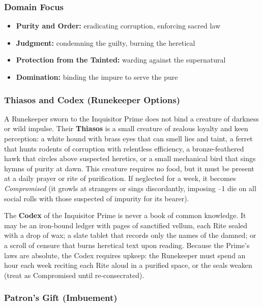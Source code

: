 \subsubsection*{Domain Focus}
\begin{itemize}
  \item \textbf{Purity and Order:} eradicating corruption, enforcing sacred law
  \item \textbf{Judgment:} condemning the guilty, burning the heretical
  \item \textbf{Protection from the Tainted:} warding against the supernatural
  \item \textbf{Domination:} binding the impure to serve the pure
\end{itemize}

\subsubsection*{Thiasos and Codex (Runekeeper Options)}

A Runekeeper sworn to the Inquisitor Prime does not bind a creature of darkness or wild impulse. Their \textbf{Thiasos} is a small creature of zealous loyalty and keen perception: a white hound with brass eyes that can smell lies and taint, a ferret that hunts rodents of corruption with relentless efficiency, a bronze-feathered hawk that circles above suspected heretics, or a small mechanical bird that sings hymns of purity at dawn. This creature requires no food, but it must be present at a daily prayer or rite of purification. If neglected for a week, it becomes \textit{Compromised} (it growls at strangers or sings discordantly, imposing --1 die on all social rolls with those suspected of impurity for its bearer).

The \textbf{Codex} of the Inquisitor Prime is never a book of common knowledge. It may be an iron-bound ledger with pages of sanctified vellum, each Rite sealed with a drop of wax; a slate tablet that records only the names of the damned; or a scroll of censure that burns heretical text upon reading. Because the Prime's laws are absolute, the Codex requires upkeep: the Runekeeper must spend an hour each week reciting each Rite aloud in a purified space, or the seals weaken (treat as Compromised until re-consecrated).

\subsubsection*{Patron's Gift (Imbuement)}

